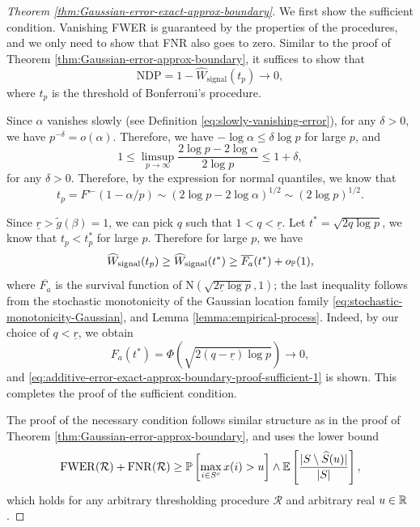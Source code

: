 \begin{proof}[Theorem \ref{thm:Gaussian-error-exact-approx-boundary}]
We first show the sufficient condition. 
Vanishing FWER is guaranteed by the properties of the procedures, and we only need to show that FNR also goes to zero. 
Similar to the proof of Theorem \ref{thm:Gaussian-error-approx-boundary}, it suffices to show that
\begin{equation} \label{eq:additive-error-exact-approx-boundary-proof-sufficient-1}
    \text{NDP} = 1 - \widehat{W}_\text{signal}(t_p) \to 0,
\end{equation}
where $t_p$ is the threshold of Bonferroni's procedure.

Since $\alpha$ vanishes slowly (see Definition \ref{eq:slowly-vanishing-error}), for any $\delta>0$, we have $p^{-\delta}=o(\alpha)$.
Therefore, we have $-\log\alpha\le\delta\log{p}$ for large $p$, and
\begin{equation*} 
    1 \le \limsup_{p\to\infty}\frac{2\log{p} - 2\log{\alpha}}{2\log{p}} \le 1+\delta,
\end{equation*}
for any $\delta>0$.
Therefore, by the expression for normal quantiles, we know that 
$$
t_p=F^\leftarrow(1-\alpha/p)\sim(2\log{p}-2\log{\alpha})^{1/2} \sim(2\log{p})^{1/2}.
$$

Since $\underline{r}>\widetilde{g}(\beta)=1$, we can pick $q$ such that $1<q<\underline{r}$.
Let $t^* = \sqrt{2q\log{p}}$, we know that $t_p<t_p^*$ for large $p$.
Therefore for large $p$, we have
$$
\widehat{W}_\text{signal}(t_p) \ge \widehat{W}_\text{signal}(t^*) \ge \overline{F_a}(t^*) + o_\P(1),
$$
where $\overline{F_a}$ is the survival function of $\mathrm{N}(\sqrt{2\underline{r}\log{p}}, 1)$; the last inequality follows from the stochastic monotonicity of the Gaussian location family \eqref{eq:stochastic-monotonicity-Gaussian}, and Lemma \ref{lemma:empirical-process}.
Indeed, by our choice of $q<\underline{r}$, we obtain
$$
F_a(t^*) = \Phi\left(\sqrt{2(q-\underline{r})\log{p}}\right)\to0,
$$
and \eqref{eq:additive-error-exact-approx-boundary-proof-sufficient-1} is shown. 
This completes the proof of the sufficient condition.

The proof of the necessary condition follows similar structure as in the proof of Theorem \ref{thm:Gaussian-error-approx-boundary}, and uses the lower bound
\begin{equation} \label{eq:additive-error-exact-approx-boundary-proof-necessary-1}
    \mathrm{FWER}(\mathcal{R}) + \mathrm{FNR}(\mathcal{R}) \ge \P\left[\max_{i\in S^c}x(i)>u\right] \wedge \E\left[\frac{|S\setminus \widehat{S}(u)|}{|S|}\right],
\end{equation}
which holds for any arbitrary thresholding procedure $\mathcal{R}$ and arbitrary real $u\in\R$.


\end{proof}
